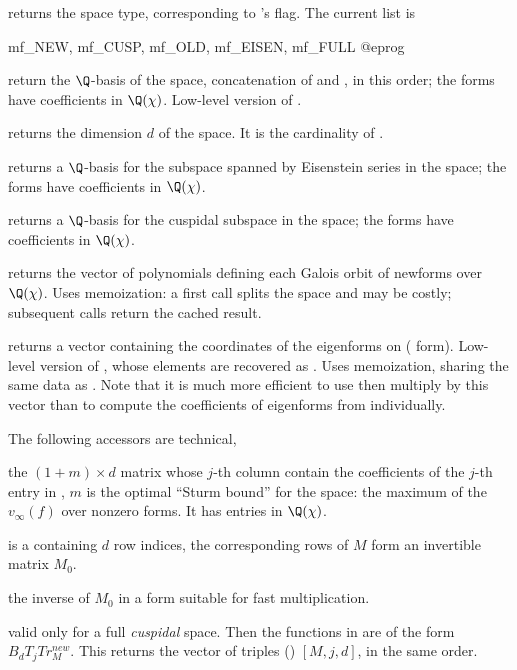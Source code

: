  returns the space type, corresponding
to 's  flag. The current list is

\bprog
mf_NEW, mf_CUSP, mf_OLD, mf_EISEN, mf_FULL
@eprog

 return the $\Q$-basis of the space,
concatenation of  and , in this order; the forms
have coefficients in $\Q(\chi)$. Low-level version of .

 returns the dimension $d$ of the space. It
is the cardinality of .

 returns a $\Q$-basis for the subspace
spanned by Eisenstein series in the space; the forms have coefficients in
$\Q(\chi)$.

 returns a $\Q$-basis for the cuspidal subspace
in the space; the forms have coefficients in $\Q(\chi)$.

 returns the vector of polynomials defining
each Galois orbit of newforms over $\Q(\chi)$. Uses memoization: a first call
splits the space and may be costly; subsequent calls return the cached
result.

 returns a vector  containing the
coordinates of the eigenforms on  ( form).
Low-level version of
, whose elements are recovered as . Uses memoization, sharing the same data as
. Note that it is much more efficient to use
 then multiply by this vector than to compute the
coefficients of eigenforms from  individually.

The following accessors are technical,

 the $(1+m) \times d$ matrix whose $j$-th column
contain the coefficients of the $j$-th entry in , $m$
is the optimal ``Sturm bound'' for the space: the maximum of the $v_\infty(f)$
over nonzero forms. It has entries in $\Q(\chi)$.

 is a  containing $d$ row
indices, the corresponding rows of $M$ form an invertible matrix $M_0$.

 the inverse of $M_0$ in a form suitable for fast
multiplication.

 valid only for a full
\emph{cuspidal} space. Then the functions in  are
of the form $B_d T_j Tr^{new}_M$. This returns the vector of triples
() $[M,j,d]$, in the same order.

